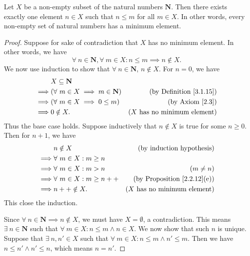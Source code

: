 \begin{proposition}\label{8.1.4}
    Let \(X\) be a non-empty subset of the natural numbers \(\mathbf{N}\).
    Then there exists exactly one element \(n \in X\) such that \(n \leq m\) for all \(m \in X\).
    In other words, every non-empty set of natural numbers has a minimum element.
\end{proposition}

\begin{proof}
    Suppose for sake of contradiction that \(X\) has no minimum element.
    In other words, we have
    \[
        \forall\ n \in \mathbf{N}, \forall\ m \in X : n \leq m \implies n \notin X.
    \]
    We now use induction to show that \(\forall\ n \in \mathbf{N}\), \(n \notin X\).
    For \(n = 0\), we have
    \begin{align*}
                 & X \subseteq \mathbf{N}                                                               \\
        \implies & (\forall\ m \in X \implies m \in \mathbf{N}) & \text{(by Definition \ref{3.1.15})}   \\
        \implies & (\forall\ m \in X \implies 0 \leq m)         & \text{(by Axiom \ref{2.3})}           \\
        \implies & 0 \notin X.                                  & \text{(\(X\) has no minimum element)}
    \end{align*}
    Thus the base case holds.
    Suppose inductively that \(n \notin X\) is true for some \(n \geq 0\).
    Then for \(n + 1\), we have
    \begin{align*}
                 & n \notin X                    & \text{(by induction hypothesis)}        \\
        \implies & \forall\ m \in X : m \geq n                                             \\
        \implies & \forall\ m \in X : m > n      & (m \neq n)                              \\
        \implies & \forall\ m \in X : m \geq n++ & \text{(by Proposition \ref{2.2.12}(e))} \\
        \implies & n++ \notin X.                 & \text{(\(X\) has no minimum element)}
    \end{align*}
    This close the induction.

    Since \(\forall\ n \in \mathbf{N} \implies n \notin X\), we must have \(X = \emptyset\), a contradiction.
    This means \(\exists\ n \in \mathbf{N}\) such that \(\forall\ m \in X : n \leq m \land n \in X\).
    We now show that such \(n\) is unique.
    Suppose that \(\exists\ n, n' \in X\) such that \(\forall\ m \in X : n \leq m \land n' \leq m\).
    Then we have \(n \leq n' \land n' \leq n\), which means \(n = n'\).
\end{proof}

